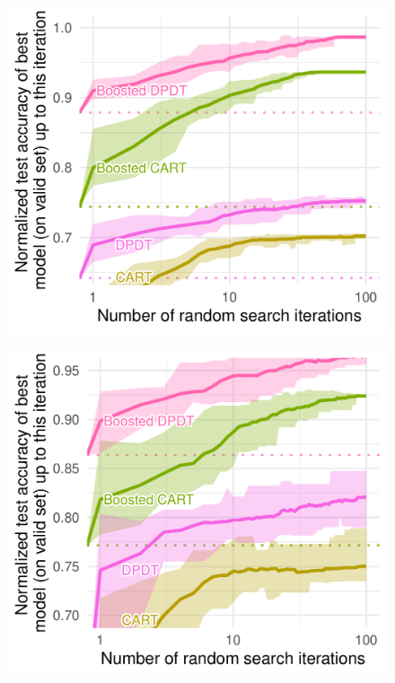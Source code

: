 \begin{figure}
\begin{minipage}{0.24\textwidth}
        \label{fig:gen-cat-time}
    \end{minipage}
          \begin{minipage}{0.24\textwidth}
          \includegraphics[width=\textwidth]{images/figures/tab_bench/random_search_classif_numerical_boosting_w_weak.pdf}
          \label{fig:boost-num}
      \end{minipage}
      \begin{minipage}{0.24\textwidth}
          \includegraphics[width=\textwidth]{images/figures/tab_bench/random_search_classif_categorical_boosting_w_weak.pdf}

\end{minipage}
\end{figure}
